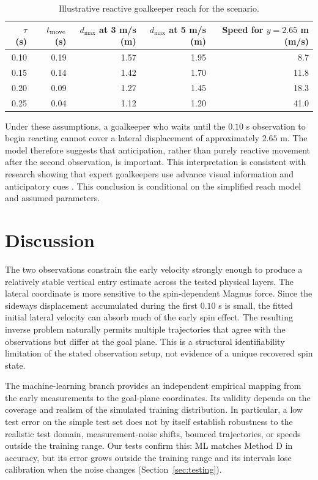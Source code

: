 \documentclass[11pt,a4paper]{article}
\begin{document}
\begin{table}[H]
\centering
\caption{Illustrative reactive goalkeeper reach for the scenario.}
\label{tab:keeper}
\small
\begin{tabular}{rrrrr}
\toprule
$\tau$ (s) & $t_{\rm move}$ (s) & $d_{\max}$ at 3 m/s (m) & $d_{\max}$ at 5 m/s (m) & Speed for $y=2.65$ m (m/s)\\
\midrule
0.10 & 0.19 & 1.57 & 1.95 & 8.7\\
0.15 & 0.14 & 1.42 & 1.70 & 11.8\\
0.20 & 0.09 & 1.27 & 1.45 & 18.3\\
0.25 & 0.04 & 1.12 & 1.20 & 41.0\\
\bottomrule
\end{tabular}
\end{table}
Under these assumptions, a goalkeeper who waits until the $0.10$ s observation to begin reacting cannot cover a lateral displacement of approximately $2.65$ m. The model therefore suggests that anticipation, rather than purely reactive movement after the second observation, is important. This interpretation is consistent with research showing that expert goalkeepers use advance visual information and anticipatory cues \citep{savelsbergh2002,dicks2010}. This conclusion is conditional on the simplified reach model and assumed parameters.

\section{Discussion}
The two observations constrain the early velocity strongly enough to produce a relatively stable vertical entry estimate across the tested physical layers. The lateral coordinate is more sensitive to the spin-dependent Magnus force. Since the sideways displacement accumulated during the first $0.10$ s is small, the fitted initial lateral velocity can absorb much of the early spin effect. The resulting inverse problem naturally permits multiple trajectories that agree with the observations but differ at the goal plane. This is a structural identifiability limitation of the stated observation setup, not evidence of a unique recovered spin state.

The machine-learning branch provides an independent empirical mapping from the early measurements to the goal-plane coordinates. Its validity depends on the coverage and realism of the simulated training distribution. In particular, a low test error on the simple test set does not by itself establish robustness to the realistic test domain, measurement-noise shifts, bounced trajectories, or speeds outside the training range. Our tests confirm this: ML matches Method D in accuracy, but its error grows outside the training range and its intervals lose calibration when the noise changes (Section~\ref{sec:testing}).
\end{document}
